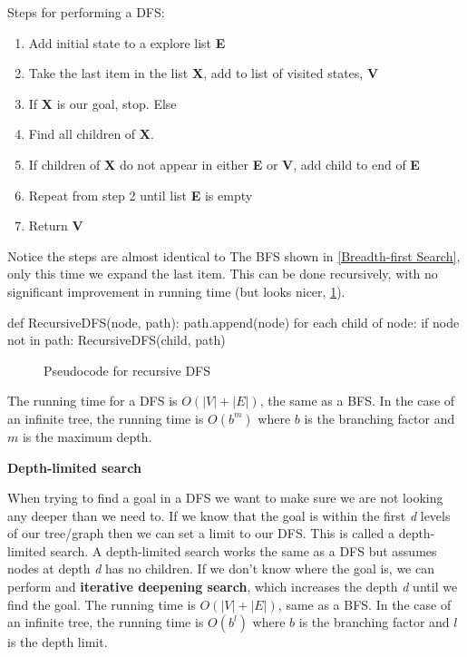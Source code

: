 \documentclass[]{final_report}
\begin{document}
\begin{minipage}[!htp]{0.5\linewidth}
Steps for performing a DFS:
\begin{enumerate}
    \item Add initial state to a explore list \textbf{E}
    \item Take the last item in the list \textbf{X}, add to list of visited states, \textbf{V}
    \item If \textbf{X} is our goal, stop. Else
    \item Find all children of \textbf{X}.
    \item If children of \textbf{X} do not appear in either \textbf{E} or \textbf{V}, add child to end of \textbf{E}
    \item Repeat from step 2 until list \textbf{E} is empty
    \item Return \textbf{V}
\end{enumerate}
\end{minipage}\hfill
{}

Notice the steps are almost identical to The BFS shown in \ref{Breadth-first Search}, only this time we expand the last item. This can be done recursively, with no significant improvement in running time (but looks nicer, \ref{fig: recursive dfs}). 

\begin{verbbox}
def RecursiveDFS(node, path):
    path.append(node)
    for each child of node:
        if node not in path:
            RecursiveDFS(child, path)
\end{verbbox}
\begin{figure}[ht]
  \centering
  \theverbbox
  \caption{Pseudocode for recursive DFS}
  \label{fig: recursive dfs}
\end{figure}


The running time for a DFS is $O(|V| + |E|)$, the same as a BFS. In the case of an infinite tree, the running time is $O(b^m)$ where $b$ is the branching factor and $m$ is the maximum depth.

\textbf{Depth-limited search} \label{Depth-limited search}

When trying to find a goal in a DFS we want to make sure we are not looking any deeper than we need to. If we know that the goal is within the first \textit{d} levels of our tree/graph then we can set a limit to our DFS. This is called a depth-limited search. A depth-limited search works the same as a DFS but assumes nodes at depth \textit{d} has no children. If we don't know where the goal is, we can perform and \textbf{iterative deepening search}, which increases the depth \textit{d} until we find the goal. The running time is $O(|V| + |E|)$, same as a BFS. In the case of an infinite tree, the running time is $O(b^l)$ where $b$ is the branching factor and $l$ is the depth limit.
\end{document}
